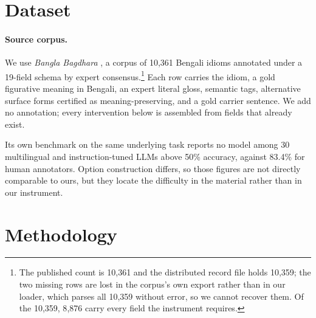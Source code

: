 \documentclass[11pt]{article}
\begin{document}
\section{Dataset}
\label{sec:dataset}

\paragraph{Source corpus.} We use \emph{Bangla Bagdhara}
\citep{sakhawat-etal-2026-words}, a corpus of 10{,}361 Bengali idioms
annotated under a 19-field schema by expert consensus.\footnote{The published
count is 10{,}361 and the distributed record file holds 10{,}359; the two missing
rows are lost in the corpus's own export rather than in our loader, which parses
all 10{,}359 without error, so we cannot recover them. Of the 10{,}359, 8{,}876
carry every field the instrument requires.} Each row carries the idiom,
a gold figurative meaning in Bengali, an expert literal gloss, semantic tags,
alternative surface forms certified as meaning-preserving, and a gold carrier
sentence. We add no annotation; every intervention below is assembled from
fields that already exist.

Its own benchmark on the same underlying task reports no model among 30
multilingual and instruction-tuned LLMs above 50\% accuracy, against 83.4\% for
human annotators. Option construction differs, so those figures are not directly
comparable to ours, but they locate the difficulty in the material rather than
in our instrument.

\section{Methodology}
\label{sec:instrument}


\end{document}

